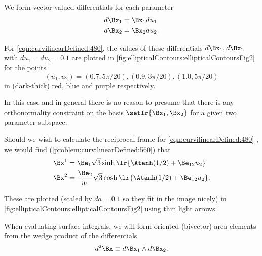 We form vector valued differentials for each parameter
\begin{equation}\label{eqn:curvilinearDefined:500}
\begin{aligned}
d\Bx_{1} &= \Bx_1 du_1 \\
d\Bx_{2} &= \Bx_2 du_2.
\end{aligned}
\end{equation}

For \cref{eqn:curvilinearDefined:480},
the values of these differentials \( d\Bx_1, d\Bx_2 \) with \( du_1 = du_2 = 0.1 \) are plotted
in
\cref{fig:ellipticalContours:ellipticalContoursFig2}
for the points
\begin{equation}\label{eqn:curvilinearDefined:600}
(u_1, u_2) = (0.7, 5 \pi/20), (0.9, 3 \pi/20), (1.0, 5 \pi/20)
\end{equation}
in
(dark-thick) red, blue and purple respectively.


In this case and in general there is no reason to presume that there is any orthonormality constraint on the basis \( \setlr{ \Bx_{1}, \Bx_{2} } \) for a given two parameter subspace.

Should we wish to calculate the reciprocal frame
for \cref{eqn:curvilinearDefined:480}
, we would find
(\cref{problem:curvilinearDefined:560}) that
\begin{equation}\label{eqn:curvilinearDefined:540}
\begin{aligned}
\Bx^{1} &= \Be_1 \sqrt{3} \sinh\lr{ \Atanh(1/2) + \Be_{12} u_2 } \\
\Bx^{2} &= \frac{\Be_2}{u_1} \sqrt{3} \cosh\lr{ \Atanh(1/2) + \Be_{12} u_2 }.
\end{aligned}
\end{equation}

These are plotted (scaled by \( da = 0.1 \) so they fit in the image nicely) in \cref{fig:ellipticalContours:ellipticalContoursFig2} using thin light arrows.

When evaluating surface integrals, we will form
oriented (bivector) area elements from the wedge product of the differentials
\begin{equation}\label{eqn:curvilinearDefined:60}
d^2 \Bx \equiv d\Bx_{1} \wedge d\Bx_{2}.
\end{equation}


